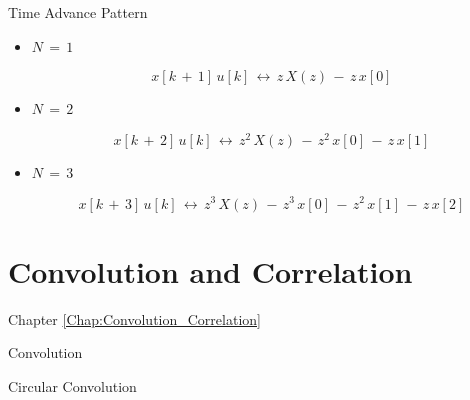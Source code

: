 \documentclass{beamer}
\begin{document}
\begin{frame}[t]{Time Advance Pattern}

\begin{itemize}

\item $N \, = \, 1$

\begin{equation*}
x[k \, + \, 1] \, u[k] \,\leftrightarrow \,  z \, X(z) \, - \, z \, x[0]
\end{equation*}

\item $N \, = \, 2$

\begin{equation*}
x[k \, + \, 2] \, u[k] \,\leftrightarrow \,  z^{2} \, X(z)\, - \, z^{2} \, x[0] \, - \,z \, x[	1]
\end{equation*}


\item $N \, = \, 3$

\begin{equation*}
x[k \, + \, 3] \, u[k] \,\leftrightarrow \,  z^{3} \, X(z)\, - \, z^{3} \, x[0] \, - \, z^{2}\, x[1] \, - \, z\, x[2]
\end{equation*}

\end{itemize}

\end{frame}



\section{Convolution and Correlation}
\label{Chap:Convolution_Correlation}
\begin{frame}[t]{Chapter \autoref{Chap:Convolution_Correlation}}
\tableofcontents[sections= \value{section}]
\end{frame}

\begin{frame}[t,allowframebreaks]{Convolution}



\end{frame}


\begin{frame}[t,allowframebreaks]{Circular Convolution}



\end{frame}
\end{document}

